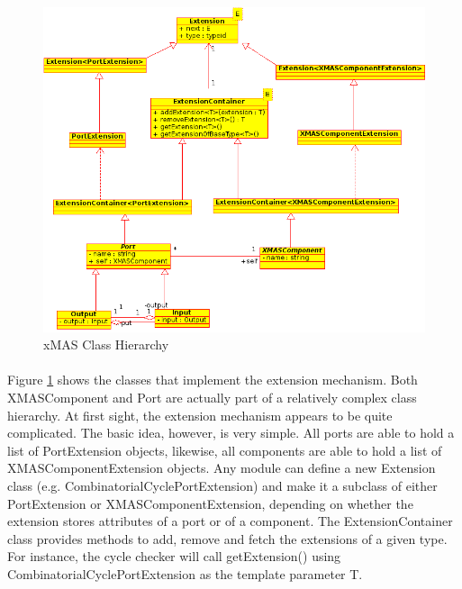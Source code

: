 \documentclass[a4paper,11pt]{article}
\begin{document}
\begin{figure}[h]
 \includegraphics[width=\textwidth]{images/xmas-hierarchy}
 \caption{xMAS Class Hierarchy}
 \label{fig:xmas-hierarchy}
\end{figure}

\paragraph{}
Figure \ref{fig:xmas-hierarchy} shows the classes that implement the extension mechanism. Both XMASComponent and Port are
actually part of a relatively complex class hierarchy.
At first sight, the extension mechanism appears to be quite complicated. The basic idea, however, is
very simple. All ports are able to hold a list of PortExtension objects, likewise,
all components are able to hold a list of XMASComponentExtension objects. Any module can define a new
Extension class (e.g. CombinatorialCyclePortExtension) and make it a subclass of either PortExtension
or XMASComponentExtension, depending on whether the extension stores attributes of a port or of a component. 
The ExtensionContainer class provides methods to add, remove and fetch the extensions of a given type.
For instance, the cycle checker will call getExtension() using CombinatorialCyclePortExtension as
the template parameter T.
\end{document}
